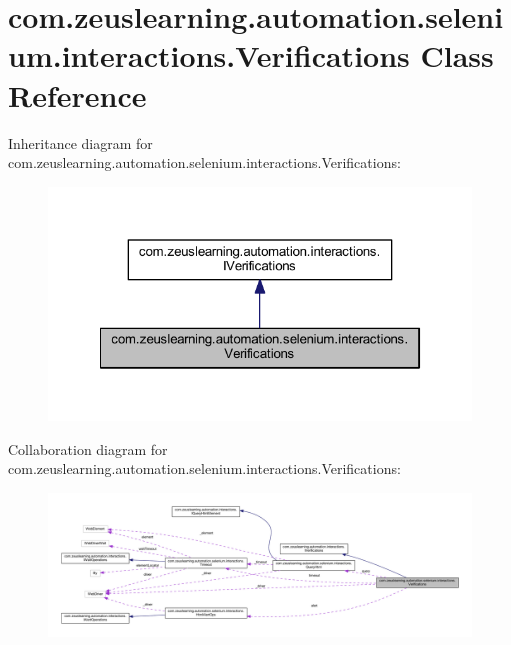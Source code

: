 \hypertarget{classcom_1_1zeuslearning_1_1automation_1_1selenium_1_1interactions_1_1Verifications}{}\section{com.\+zeuslearning.\+automation.\+selenium.\+interactions.\+Verifications Class Reference}
\label{classcom_1_1zeuslearning_1_1automation_1_1selenium_1_1interactions_1_1Verifications}


Inheritance diagram for com.\+zeuslearning.\+automation.\+selenium.\+interactions.\+Verifications\+:\nopagebreak
\begin{figure}[H]
\begin{center}
\leavevmode
\includegraphics[width=322pt]{da/ddb/classcom_1_1zeuslearning_1_1automation_1_1selenium_1_1interactions_1_1Verifications__inherit__graph}
\end{center}
\end{figure}


Collaboration diagram for com.\+zeuslearning.\+automation.\+selenium.\+interactions.\+Verifications\+:
\nopagebreak
\begin{figure}[H]
\begin{center}
\leavevmode
\includegraphics[width=350pt]{dc/d33/classcom_1_1zeuslearning_1_1automation_1_1selenium_1_1interactions_1_1Verifications__coll__graph}
\end{center}
\end{figure}
